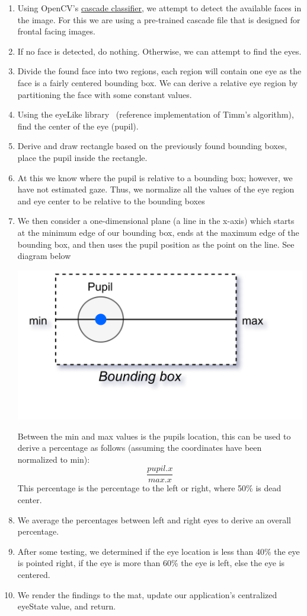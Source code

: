 \begin{enumerate}
    \item Using OpenCV's \href{https://docs.opencv.org/3.4/db/d28/tutorial_cascade_classifier.html}{cascade classifier}, we attempt to detect the available faces in the image. For this we are using a pre-trained cascade file that is designed for frontal facing images.
    \item If no face is detected, do nothing. Otherwise, we can attempt to find the eyes.
    \item Divide the found face into two regions, each region will contain one eye as the face is a fairly centered bounding box. We can derive a relative eye region by partitioning the face with some constant values.
    \item Using the eyeLike library~\cite{trishume} (reference implementation of Timm's algorithm), find the center of the eye (pupil).
    \item Derive and draw rectangle based on the previously found bounding boxes, place the pupil inside the rectangle. 
    \item At this we know where the pupil is relative to a bounding box; however, we have not estimated gaze. Thus, we normalize all the values of the eye region and eye center to be relative to the bounding boxes 
    \item We then consider a one-dimensional plane (a line in the x-axis) which starts at the minimum edge of our bounding box, ends at the maximum edge of the bounding box, and then uses the pupil position as the point on the line. See diagram below
    \begin{center}
        \includegraphics[width=0.5\linewidth]{figures/EyeLoc.png}
    \end{center}
    Between the min and max values is the pupils location, this can be used to derive a percentage as follows (assuming the coordinates have been normalized to min):
    \[
        \frac{pupil.x}{max.x}
        \]
    This percentage is the percentage to the left or right, where 50\% is dead center.

    \item We average the percentages between left and right eyes to derive an overall percentage.
    \item After some testing, we determined if the eye location is less than 40\% the eye is pointed right, if the eye is more than 60\% the eye is left, else the eye is centered.
    \item We render the findings to the mat, update our application's centralized eyeState value, and return.
\end{enumerate}


